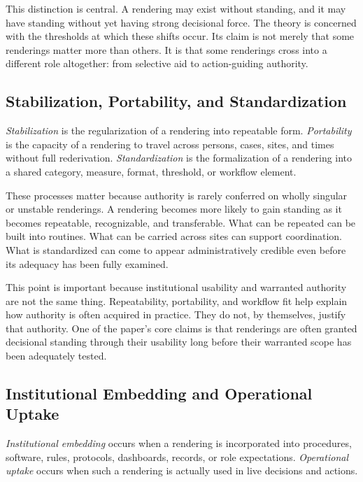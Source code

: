 \documentclass[11pt]{article}
\renewcommand{\emph}[1]{\textit{#1}}
\begin{document}
This distinction is central. A rendering may exist without standing, and it may have standing without yet having strong decisional force. The theory is concerned with the thresholds at which these shifts occur. Its claim is not merely that some renderings matter more than others. It is that some renderings cross into a different role altogether: from selective aid to action-guiding authority.\cite{Swanson2026MediatedJudgmentConstraint}

\subsection{Stabilization, Portability, and Standardization}

\emph{Stabilization} is the regularization of a rendering into repeatable form. \emph{Portability} is the capacity of a rendering to travel across persons, cases, sites, and times without full rederivation. \emph{Standardization} is the formalization of a rendering into a shared category, measure, format, threshold, or workflow element.

These processes matter because authority is rarely conferred on wholly singular or unstable renderings. A rendering becomes more likely to gain standing as it becomes repeatable, recognizable, and transferable. What can be repeated can be built into routines. What can be carried across sites can support coordination. What is standardized can come to appear administratively credible even before its adequacy has been fully examined.\cite{TimmermansEpstein2010WorldOfStandards,Porter1995TrustInNumbers,EspelandStevens1998Commensuration,BowkerStar1999SortingThingsOut}

This point is important because institutional usability and warranted authority are not the same thing. Repeatability, portability, and workflow fit help explain how authority is often acquired in practice. They do not, by themselves, justify that authority. One of the paper's core claims is that renderings are often granted decisional standing through their usability long before their warranted scope has been adequately tested.

\subsection{Institutional Embedding and Operational Uptake}

\emph{Institutional embedding} occurs when a rendering is incorporated into procedures, software, rules, protocols, dashboards, records, or role expectations. \emph{Operational uptake} occurs when such a rendering is actually used in live decisions and actions.
\end{document}
